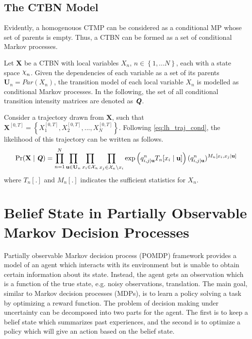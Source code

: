 \subsection{The CTBN Model}
Evidently, a homogenouos CTMP can be considered as a conditional MP whose set of parents is empty. Thus, a CTBN can be formed as a set of conditional Markov processes.

Let \textbf{X} be a CTBN with local variables $ X_n $, $ n \in \left\lbrace 1,...N \right\rbrace $, each with a state space $ \rchi_n $. Given the dependencies of each variable as a set of its parents $ \textbf{U}_n = Par(X_n) $, the transition model of each local variable $ X_n $ is modelled as conditional Markov processes. \cite{Nodelman1995} In the following, the set of all conditional transition intensity matrices are denoted as $ \textbf{\textit{Q}} $.

Consider a trajectory drawn from $ \textbf{X} $, such that $ \textbf{X}^{[0, T]} = \left\lbrace X_1^{[0,T]},  X_2^{[0,T]}, ...,  X_N^{[0,T]}\right\rbrace  $. Following \autoref{eq:lh_traj_cond}, the likelihood of this trajectory can be written as follows.
\begin{align}
\operatorname{Pr}( \textbf{X}  \mid \textbf{\textit{Q}} ) = \prod_{n=1}^{N} \prod_{\textbf{u} \in \mathcal{\textbf{U}}_{n}} \prod_{x_i \in \mathcal{X}_{n}} \prod_{x_j \in \mathcal{X}_{n} \backslash x_i}
\exp \left(q_{i,j\mid \textbf{u}}^{n} T_{n}[x_i\mid \textbf{u}]\right) (q_{i,j\mid \textbf{u}}^{n})^{M_{n}[x_i, x_j\mid \textbf{u}]}
\label{eq:lh_CTBN}
\end{align}
where $ T_n[.] $ and $ M_n[.] $ indicates the sufficient statistics for $ X_n $.

\section{Belief State in Partially Observable Markov Decision Processes}
\label{sec:belief_POMDP}
Partially observable Markov decision process (POMDP) framework provides a model of an agent which interacts with its environment but is unable to obtain certain information about its state. Instead, the agent gets an observation which is a function of the true state, e.g. noisy observations, translation. The main goal, similar to Markov decision processes (MDPs), is to learn a policy solving a task by optimizing a reward function. The problem of decision making under uncertainty can be decomposed into two parts for the agent. The first is to keep a belief state which summarizes past experiences, and the second is to optimize a policy which will give an action based on the belief state. \cite{KAELBLING199899,Murphy2000}

